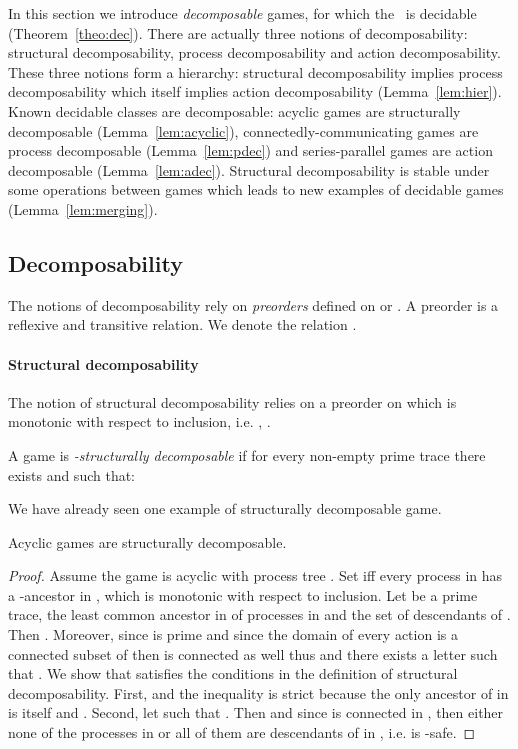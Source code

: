 \documentclass[a4paper,UKenglish]{lipics-v2016}
\begin{document}
In this section we introduce \emph{decomposable} games,
for which the \dsp\ is decidable (Theorem~\ref{theo:dec}).
There are actually three notions of decomposability:
structural decomposability, process decomposability and action decomposability.
These three notions form a hierarchy:
structural decomposability implies process decomposability which itself implies action decomposability (Lemma~\ref{lem:hier}).
Known decidable classes are decomposable:
acyclic games are structurally decomposable (Lemma~\ref{lem:acyclic}),
connectedly-communicating games are process decomposable (Lemma~\ref{lem:pdec})
and series-parallel games are action decomposable
(Lemma~\ref{lem:adec}).
Structural decomposability is stable under some  operations between games which leads to new examples
of decidable games (Lemma~\ref{lem:merging}).

\subsection{Decomposability}



The notions of decomposability rely on \emph{preorders} defined on  or . A preorder  is a reflexive and transitive relation.
We denote  the relation .
 
\paragraph*{Structural decomposability}
The notion of structural decomposability relies on a preorder
 on  
which is 
monotonic with respect to inclusion, i.e. ,
.



\begin{definition}
\label{unif}
A game is \emph{-structurally decomposable}
if for every non-empty prime trace 
there exists 
and  
such that:

\end{definition}

We have already seen one example of structurally decomposable game.

\begin{lemma}\label{lem:acyclic}
Acyclic games are structurally decomposable.
\end{lemma}
\begin{proof}
Assume the game is acyclic with process tree .
Set 
 iff 
every process in  has a -ancestor in , which is  monotonic with respect to inclusion.
Let  be a prime trace,
 the least common ancestor
in  of processes in  and  the set of descendants of .
Then .
Moreover, since  is prime and since the domain of every action is a connected subset of 
then  is connected as well thus 
and there exists a letter  such that .
We show that  satisfies the conditions in the definition of structural decomposability.
First, 
and the inequality is strict because 
the only ancestor of  in  is  itself and .
Second, let  such that .
Then  and since  is connected in ,
then either none of the processes in  or
all of them are descendants of  in , i.e.  is -safe.
\end{proof}
\end{document}
